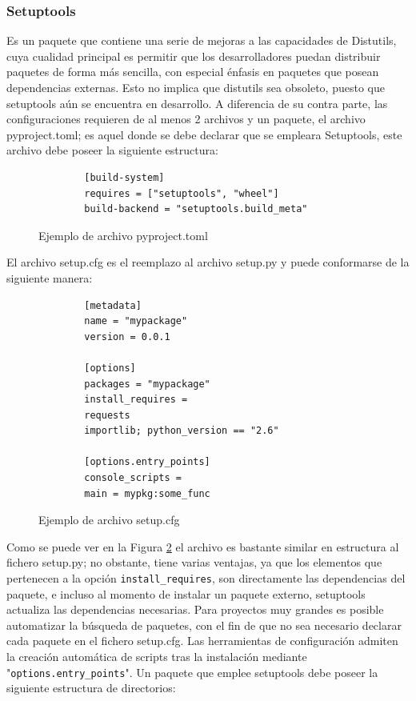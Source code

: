 \subsubsection{Setuptools}
Es un paquete que contiene una serie de mejoras a las capacidades de Distutils, cuya cualidad principal es permitir que los desarrolladores puedan distribuir paquetes de forma más sencilla, con especial énfasis en paquetes que posean dependencias externas. Esto no implica que distutils sea obsoleto, puesto que setuptools aún se encuentra en desarrollo. A diferencia de su contra parte, las configuraciones requieren de al menos 2 archivos y un paquete, el archivo pyproject.toml; es aquel donde se debe declarar que se empleara Setuptools, este archivo debe poseer la siguiente estructura:
\begin{figure}[H]
    \centering
    \begin{verbatim}
		[build-system]
        requires = ["setuptools", "wheel"]
        build-backend = "setuptools.build_meta"
	\end{verbatim}
    \caption{Ejemplo de archivo pyproject.toml}
    \label{pyproject.toml}
\end{figure}
El archivo setup.cfg es el reemplazo al archivo setup.py y puede conformarse de la siguiente manera:
\begin{figure}[H]
    \centering
    \begin{verbatim}
		[metadata]
        name = "mypackage"
        version = 0.0.1

        [options]
        packages = "mypackage"
        install_requires =
        requests
        importlib; python_version == "2.6"
        
        [options.entry_points]
        console_scripts =
        main = mypkg:some_func
	\end{verbatim}
    \caption{Ejemplo de archivo setup.cfg}
    \label{setup.cfg}
\end{figure}
Como se puede ver en la Figura \ref{setup.cfg} el archivo es bastante similar en estructura al fichero setup.py; no obstante, tiene varias ventajas, ya que los elementos que pertenecen a la opción \texttt{install_requires}, son directamente las dependencias del paquete, e incluso al momento de instalar un paquete externo, setuptools actualiza las dependencias necesarias. Para proyectos muy grandes es posible automatizar la búsqueda de paquetes, con el fin de que no sea necesario declarar cada paquete en el fichero setup.cfg. 
Las herramientas de configuración admiten la creación automática de scripts tras la instalación mediante "\texttt{options.entry_points}". Un paquete que emplee setuptools debe poseer la siguiente estructura de directorios:
